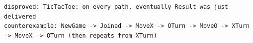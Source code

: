 \begin{lstlisting}[language={},basicstyle=\ttfamily\footnotesize,breaklines=true]
disproved: TicTacToe: on every path, eventually Result was just delivered
counterexample: NewGame -> Joined -> MoveX -> OTurn -> MoveO -> XTurn -> MoveX -> OTurn (then repeats from XTurn)
\end{lstlisting}
